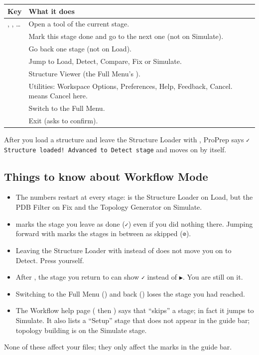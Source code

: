 \medskip
\begin{tabularx}{\linewidth}{@{}lL@{}}
\toprule
\textbf{Key} & \textbf{What it does} \\
\midrule
{}, , \ldots & Open a tool of the current stage. \\
 & Mark this stage done and go to the next one (not on Simulate). \\
 & Go back one stage (not on Load). \\
     & Jump to Load, Detect, Compare, Fix
or Simulate. \\
 & Structure Viewer (the Full Menu's ). \\
 & Utilities:  Workspace Options,  Preferences, 
Help,  Feedback,  Cancel.  means Cancel here. \\
 & Switch to the Full Menu. \\
 & Exit (asks to confirm). \\
\bottomrule
\end{tabularx}

\medskip
After you load a structure and leave the Structure Loader with , ProPrep
says \texttt{✓ Structure loaded! Advanced to Detect stage} and moves on by
itself.

\subsection*{Things to know about Workflow Mode}

\begin{itemize}
  \item The numbers restart at every stage:  is the Structure Loader on
  Load, but the PDB Filter on Fix and the Topology Generator on Simulate.
  \item {} marks the stage you leave as done (\texttt{✓}) even if you did
  nothing there. Jumping forward with  marks the stages in between as
  skipped (\texttt{⊘}).
  \item Leaving the Structure Loader with  instead of  does not
  move you on to Detect. Press  yourself.
  \item After , the stage you return to can show \texttt{✓} instead of
  \texttt{▶}. You are still on it.
  \item Switching to the Full Menu () and back () loses the stage
  you had reached.
  \item The Workflow help page ( then ) says that 
  ``skips'' a stage; in fact it jumps to Simulate. It also lists a ``Setup''
  stage that does not appear in the guide bar; topology building is on the
  Simulate stage.
\end{itemize}

None of these affect your files; they only affect the marks in the guide bar.
